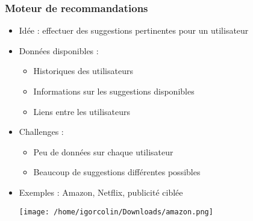 \documentclass[c]{beamer}
\author{Igor Colin}
\date{\today}
\begin{document}
\begin{frame}
    \frametitle{Moteur de recommandations}

    \begin{itemize}
        \item Id\'ee : effectuer des suggestions pertinentes pour un
            utilisateur
        \item Donn\'ees disponibles :
            \begin{itemize}
                \item Historiques des utilisateurs
                \item Informations sur les suggestions disponibles
                \item Liens entre les utilisateurs
            \end{itemize}
        \item Challenges :
            \begin{itemize}
                \item Peu de donn\'ees sur chaque utilisateur
                \item Beaucoup de suggestions diff\'erentes possibles
            \end{itemize}
        \item Exemples : Amazon, Netflix, publicit\'e cibl\'ee
            \begin{center}
            \texttt{[image: /home/igorcolin/Downloads/amazon.png]}
        \end{center}
    \end{itemize}
\end{frame}
\end{document}
